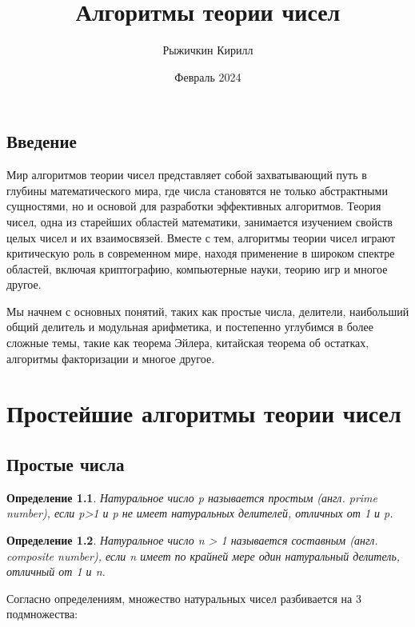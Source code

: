 \documentclass[12pt, a4paper, openany]{book}
\title{Алгоритмы теории чисел}
\author{Рыжичкин Кирилл}
\date{Февраль 2024}
\newtheorem*{definition}{Определение}
\begin{document}
\maketitle
\lstset{language=C++}

\tableofcontents

\newpage
\section*{Введение}

Мир алгоритмов теории чисел представляет собой захватывающий путь в глубины математического мира, где числа становятся не только абстрактными сущностями, но и основой для разработки эффективных алгоритмов. Теория чисел, одна из старейших областей математики, занимается изучением свойств целых чисел и их взаимосвязей. Вместе с тем, алгоритмы теории чисел играют критическую роль в современном мире, находя применение в широком спектре областей, включая криптографию, компьютерные науки, теорию игр и многое другое.

Мы начнем с основных понятий, таких как простые числа, делители, наибольший общий делитель и модульная арифметика, и постепенно углубимся в более сложные темы, такие как теорема Эйлера, китайская теорема об остатках, алгоритмы факторизации и многое другое.

\chapter[Простейшие алгоритмы теории чисел]{Простейшие алгоритмы теории чисел}
\section{Простые числа}

\begin{definition}
Натуральное число p называется простым (англ. prime number), если p>1 и p не имеет натуральных делителей, отличных от 1 и p.
\end{definition}

\begin{definition}
Натуральное число n > 1 называется составным (англ. composite number), если n имеет по крайней мере один натуральный делитель, отличный от 1 и n.
\end{definition}

\noindent
Согласно определениям, множество натуральных чисел разбивается на 3 подмножества:
\end{document}
